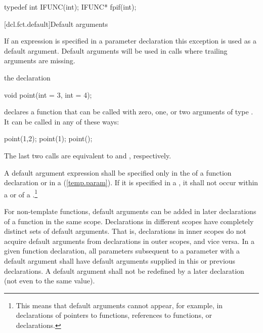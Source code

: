 \begin{codeblock}
typedef int  IFUNC(int);
IFUNC*  fpif(int);
\end{codeblock}
\exitnoteb


[dcl.fct.default]{Default arguments}%

\pnum
If an expression is specified in a parameter declaration this exception
is used as a default argument.
Default arguments will be used in calls where trailing arguments are missing.

\pnum
{}%
\enterexample
the declaration

\begin{codeblock}
void point(int = 3, int = 4);
\end{codeblock}

declares a function that can be called with zero, one, or two arguments of type
.
It can be called in any of these ways:

\begin{codeblock}
point(1,2);  point(1);  point();
\end{codeblock}

The last two calls are equivalent to
and
,
respectively.
\exitexample

\pnum
A default argument expression shall be specified only in the
of a function declaration or in a
(\ref{temp.param}).
If it is specified in a
,
it shall not occur within a
or
of a
.\footnote{This means that default
arguments cannot appear,
for example, in declarations of pointers to functions,
references to functions, or
declarations.
}

\pnum
For non-template functions, default arguments can be added in later
declarations of a
function in the same scope.
Declarations in different
scopes have completely distinct sets of default arguments.
That
is, declarations in inner scopes do not acquire default
arguments from declarations in outer scopes, and vice versa.
In
a given function declaration, all parameters subsequent to a
parameter with a default argument shall have default arguments
supplied in this or previous declarations.
A default argument
shall not be redefined by a later declaration (not even to the
same value).
\enterexample

